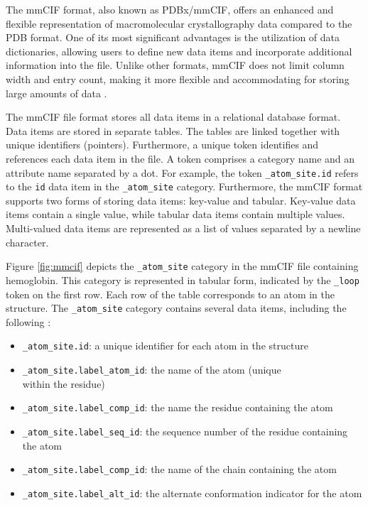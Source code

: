 \documentclass[
  digital,     %
  oneside,     %
  nosansbold,  %
  nocolorbold, %
  lof,         %
  lot,         %
]{fithesis4}
\begin{document}
The mmCIF format, also known as PDBx/mmCIF, offers an enhanced and flexible representation of macromolecular crystallography data compared to the PDB format. One of its most significant advantages is the utilization of data dictionaries, allowing users to define new data items and incorporate additional information into the file. Unlike other formats, mmCIF does not limit column width and entry count, making it more flexible and accommodating for storing large amounts of data \cite{qtpie}.

The mmCIF file format stores all data items in a relational database format. Data items are stored in separate tables. The tables are linked together with unique identifiers (pointers). Furthermore, a unique token identifies and references each data item in the file. A token comprises a category name and an attribute name separated by a dot. For example, the token \texttt{\_atom\_site.id} refers to the \texttt{id} data item in the \texttt{\_atom\_site} category. Furthermore, the mmCIF format supports two forms of storing data items: key-value and tabular. Key-value data items contain a single value, while tabular data items contain multiple values. Multi-valued data items are represented as a list of values separated by a newline character. \cite{pdb101}

Figure \ref{fig:mmcif} depicts the \texttt{\_atom\_site} category in the mmCIF file containing hemoglobin. This category is represented in tabular form, indicated by the \texttt{\_loop} token on the first row. Each row of the table corresponds to an atom in the structure. The \texttt{\_atom\_site} category contains several data items, including the following \cite{mmcif_dictionary}:

\begin{itemize}
  \item \texttt{\_atom\_site.id}: a unique identifier for each atom in the structure
  \item \texttt{\_atom\_site.label\_atom\_id}: the name of the atom (unique \\
  within the residue)
  \item \texttt{\_atom\_site.label\_comp\_id}: the name the residue containing the atom
  \item \texttt{\_atom\_site.label\_seq\_id}: the sequence number of the residue containing the atom
  \item \texttt{\_atom\_site.label\_comp\_id}: the name of the chain containing the atom
  \item \texttt{\_atom\_site.label\_alt\_id}: the alternate conformation indicator for the atom
\end{itemize}
\end{document}
